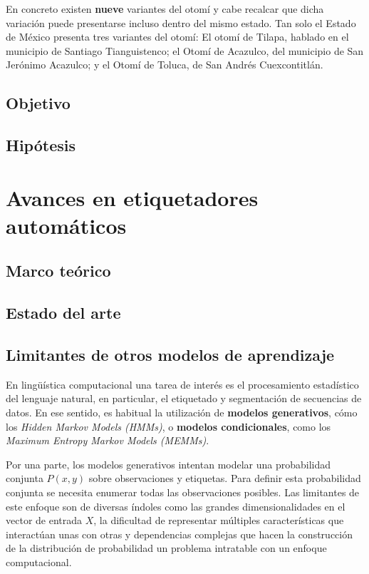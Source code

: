 \documentclass[letterpaper,12pt,oneside]{book}
\begin{document}
En concreto existen \textbf{nueve} variantes del otomí y cabe recalcar que dicha variación puede presentarse incluso dentro del mismo estado. Tan solo el Estado de México presenta tres variantes del otomí: El otomí de Tilapa, hablado en el municipio de Santiago Tianguistenco; el Otomí de Acazulco, del municipio de San Jerónimo Acazulco; y el Otomí de Toluca, de San Andrés Cuexcontitlán.

\section{Objetivo}

\section{Hipótesis}

\chapter{Avances en etiquetadores automáticos}

\section{Marco teórico}

\section{Estado del arte}

\section{Limitantes de otros modelos de aprendizaje}

En lingüística computacional una tarea de interés es el procesamiento estadístico del lenguaje natural, en particular, el etiquetado y segmentación de secuencias de datos. En ese sentido, es habitual la utilización de \textbf{modelos generativos}, cómo los \textit{Hidden Markov Models (HMMs)}, o \textbf{modelos condicionales}, como los \textit{Maximum Entropy Markov Models (MEMMs)}.

Por una parte, los modelos generativos intentan modelar una probabilidad conjunta $P(x,y)$ sobre observaciones y etiquetas. Para definir esta probabilidad conjunta se necesita enumerar todas las observaciones posibles. Las limitantes de este enfoque son de diversas índoles como las grandes dimensionalidades en el vector de entrada $X$, la dificultad de representar múltiples características que interactúan unas con otras y dependencias complejas que hacen la construcción de la distribución de probabilidad un problema intratable con un enfoque computacional.
\end{document}

